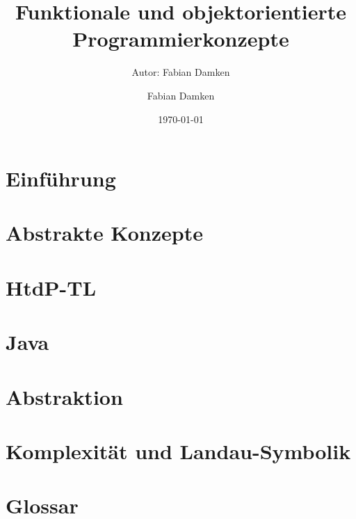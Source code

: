 \documentclass[a4paper, 11pt, accentcolor = tud3b]{tudreport}
\title{Funktionale und objektorientierte Programmierkonzepte}
\subtitle{Autor: Fabian Damken}
\author{Fabian Damken}
\date{\today}
\providecommand{\racket}{HtdP-TL}
\begin{document}
	

    \maketitle
    \tableofcontents
    \listoftodos


    \chapter{Einführung}
	    \label{c:einfuehrung}
    
        

	\chapter{Abstrakte Konzepte}
		\label{c:abstrakte_konzepte}
	
		

    \chapter{\racket}
	    \label{c:racket}
    
        

    \chapter{Java}
	    \label{c:java}
    
        
    
    \chapter{Abstraktion}
	    \label{c:abstraktion}
    
	    
    
    \chapter{Komplexität und Landau-Symbolik}
	    \label{c:komplexitaet}
    
	    

    \chapter{Glossar}
	    \label{c:glossar}
    
    
    
\end{document}
